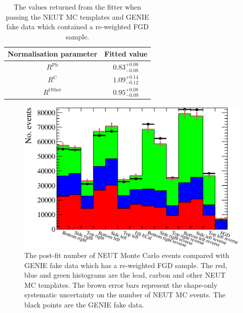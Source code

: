 \begin{table}
  \begin{tabular}{c c }
    Normalisation parameter & Fitted value \\ \hline \hline
    $R^{\textrm{Pb}}$ & $0.83^{+0.08}_{-0.08}$  \\
    $R^{\textrm{C}}$ & $1.09^{+0.14}_{-0.12}$  \\
    $R^{\textrm{Other}}$ & $0.95^{+0.08}_{-0.09}$  \\
  \end{tabular}
  \caption{The values returned from the fitter when passing the NEUT MC templates and GENIE fake data which contained a re-weighted FGD sample.}
  \label{table:NEUTMCTemplatesGENIEDataReweightFGDPostFit}
\end{table}
\begin{figure}
  \centering
  \includegraphics[width=15cm]{images/measurement/validation/genie/MCTemplatesWithSystematics_GenieDataReWeighted_PostFit.eps}
  \caption{The post-fit number of NEUT Monte Carlo events compared with GENIE fake data which has a re-weighted FGD sample.  The red, blue and green histograms are the lead, carbon and other NEUT MC templates.  The brown error bars represent the shape-only systematic uncertainty on the number of NEUT MC events.  The black points are the GENIE fake data.}
  \label{fig:MCTemplatesWithSystematicsGenieDataReWeightdPostFit}
\end{figure}

